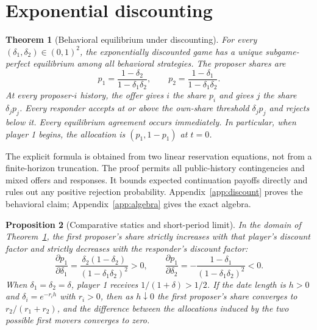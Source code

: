 \documentclass[11pt]{article}
\newtheorem{theorem}{Theorem}
\newtheorem{proposition}[theorem]{Proposition}
\begin{document}
\section{Exponential discounting}\label{sec:discount}
\begin{theorem}[Behavioral equilibrium under discounting]\label{th:discount}
For every $(\delta_1,\delta_2)\in(0,1)^2$, the exponentially discounted game has a unique subgame-perfect equilibrium among all behavioral strategies. The proposer shares are
\begin{equation}\label{eq:formula}
 p_1=\frac{1-\delta_2}{1-\delta_1\delta_2},\qquad
 p_2=\frac{1-\delta_1}{1-\delta_1\delta_2}.
\end{equation}
At every proposer-$i$ history, the offer gives $i$ the share $p_i$ and gives $j$ the share $\delta_jp_j$. Every responder accepts at or above the own-share threshold $\delta_jp_j$ and rejects below it. Every equilibrium agreement occurs immediately. In particular, when player 1 begins, the allocation is $(p_1,1-p_1)$ at $t=0$.
\end{theorem}

The explicit formula is obtained from two linear reservation equations, not from a finite-horizon truncation. The proof permits all public-history contingencies and mixed offers and responses. It bounds expected continuation payoffs directly and rules out any positive rejection probability. Appendix~\ref{app:discount} proves the behavioral claim; Appendix~\ref{app:algebra} gives the exact algebra.

\begin{proposition}[Comparative statics and short-period limit]\label{prop:statics}
In the domain of Theorem~\ref{th:discount}, the first proposer's share strictly increases with that player's discount factor and strictly decreases with the responder's discount factor:
\begin{equation}\label{eq:derivatives}
 \frac{\partial p_1}{\partial\delta_1}
 =\frac{\delta_2(1-\delta_2)}{(1-\delta_1\delta_2)^2}>0,
 \qquad
 \frac{\partial p_1}{\partial\delta_2}
 =-\frac{1-\delta_1}{(1-\delta_1\delta_2)^2}<0.
\end{equation}
When $\delta_1=\delta_2=\delta$, player 1 receives $1/(1+\delta)>1/2$. If the date length is $h>0$ and $\delta_i=e^{-r_i h}$ with $r_i>0$, then as $h\downarrow0$ the first proposer's share converges to $r_2/(r_1+r_2)$, and the difference between the allocations induced by the two possible first movers converges to zero.
\end{proposition}
\end{document}
